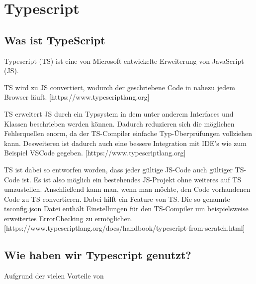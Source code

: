 \section{Typescript}

\subsection{Was ist TypeScript}

Typescript (TS) ist eine von Microsoft entwickelte Erweiterung von JavaScript (JS). \cite{website_pubmed_about}

TS wird zu JS convertiert, wodurch der geschriebene Code in nahezu jedem Browser läuft.
[https://www.typescriptlang.org]

TS erweitert JS durch ein Typsystem in dem unter anderem Interfaces und Klassen beschrieben werden können. Dadurch reduzieren sich die möglichen Fehlerquellen enorm, da der TS-Compiler einfache Typ-Überprüfungen vollziehen kann. Desweiteren ist dadurch auch eine bessere Integration mit IDE's wie zum Beispiel VSCode gegeben.
[https://www.typescriptlang.org]

TS ist dabei so entworfen worden, dass jeder gültige JS-Code auch gültiger TS-Code ist. Es ist also möglich ein bestehendes JS-Projekt ohne weiteres auf TS umzustellen. Anschließend kann man, wenn man möchte, den Code vorhandenen Code zu TS convertieren. Dabei hilft ein Feature von TS. Die so genannte tsconfig.json Datei enthält Einstellungen für den TS-Compiler um beispielsweise erweitertes ErrorChecking zu ermöglichen. [https://www.typescriptlang.org/docs/handbook/typescript-from-scratch.html]

\subsection{Wie haben wir Typescript genutzt?}

Aufgrund der vielen Vorteile von 
